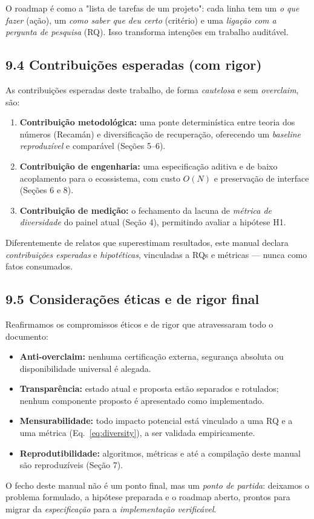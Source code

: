 \begin{intuicao}
O roadmap é como a "lista de tarefas de um projeto": cada linha tem um \emph{o
que fazer} (ação), um \emph{como saber que deu certo} (critério) e uma \emph{ligação
com a pergunta de pesquisa} (RQ). Isso transforma intenções em trabalho auditável.
\end{intuicao}

\subsection*{9.4 Contribuições esperadas (com rigor)}

 As contribuições esperadas deste trabalho, de forma \emph{cautelosa} e
sem \emph{overclaim}, são:

\begin{enumerate}[label=\arabic*.]
  \item \textbf{Contribuição metodológica:} uma ponte determinística entre teoria
        dos números (Recamán) e diversificação de recuperação, oferecendo um
        \emph{baseline reproduzível} e comparável (Seções 5--6).
  \item \textbf{Contribuição de engenharia:} uma especificação aditiva e de baixo
        acoplamento para o ecossistema, com custo $O(N)$ e preservação de
        interface (Seções 6 e 8).
  \item \textbf{Contribuição de medição:} o fechamento da lacuna de \emph{métrica de
        diversidade} do painel atual (Seção 4), permitindo avaliar a hipótese H1.
\end{enumerate}

\begin{pontochave}
Diferentemente de relatos que superestimam resultados, este manual declara
\emph{contribuições esperadas} e \emph{hipotéticas}, vinculadas a RQs e métricas
— nunca como fatos consumados.
\end{pontochave}

\subsection*{9.5 Considerações éticas e de rigor final}

 Reafirmamos os compromissos éticos e de rigor que atravessaram todo o
documento:

\begin{itemize}
  \item \textbf{Anti-overclaim:} nenhuma certificação externa, segurança absoluta
        ou disponibilidade universal é alegada.
  \item \textbf{Transparência:} estado atual e proposta estão separados e
        rotulados; nenhum componente proposto é apresentado como implementado.
  \item \textbf{Mensurabilidade:} todo impacto potencial está vinculado a uma RQ e
        a uma métrica (Eq.~\ref{eq:diversity}), a ser validada empiricamente.
  \item \textbf{Reprodutibilidade:} algoritmos, métricas e até a compilação deste
        manual são reproduzíveis (Seção 7).
\end{itemize}

\begin{pontochave}
O fecho deste manual não é um ponto final, mas um \emph{ponto de partida}:
deixamos o problema formulado, a hipótese preparada e o roadmap aberto, prontos
para migrar da \emph{especificação} para a \emph{implementação verificável}.
\end{pontochave}
